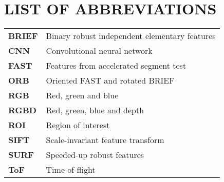
\section*{LIST OF ABBREVIATIONS}

\begin{tabular}{p{3cm}l}
  
  	\textbf{BRIEF}			& Binary robust independent elementary features \\
	\textbf{CNN} 			& Convolutional neural network \\
	\textbf{FAST}			& Features from accelerated segment test \\
	\textbf{ORB}			& Oriented FAST and rotated BRIEF \\
	\textbf{RGB}			& Red, green and blue \\
	\textbf{RGBD}			& Red, green, blue and depth \\
	\textbf{ROI}			& Region of interest \\
	\textbf{SIFT}			& Scale-invariant feature transform \\
	\textbf{SURF}			& Speeded-up robust features \\
	\textbf{ToF}			& Time-of-flight \\
	

\end{tabular}

